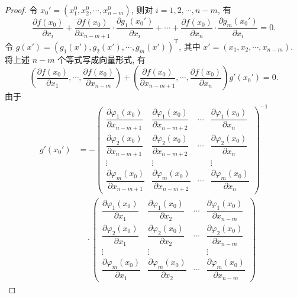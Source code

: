 \documentclass[12pt,fontset=fandol]{ctexart}
\begin{document}
\begin{proof}
令 $x_0'=(x_1^0,x_2^0,\cdots,x_{n-m}^0)$, 则对 $i=1,2,\cdots,n-m$, 有
\[
  \frac{\partial f(x_0)}{\partial x_i}
  +\frac{\partial f(x_0)}{\partial x_{n-m+1}}\cdot
  \frac{\partial g_1(x_0')}{\partial x_i}
  +\cdots+
  \frac{\partial f(x_0)}{\partial x_n}\cdot
  \frac{\partial g_m(x_0')}{\partial x_i}
  =0.
\]
令 $g(x')=(g_1(x'),g_2(x'),\cdots,g_m(x'))^{\mathrm T}$, 其中 $x'=(x_1,x_2,\cdots,x_{n-m})$. 将上述 $n-m$ 个等式写成向量形式, 有
\begin{equation}
  \left(
    \frac{\partial f(x_0)}{\partial x_1},
    \cdots,
    \frac{\partial f(x_0)}{\partial x_{n-m}}
  \right)
  +
  \left(
    \frac{\partial f(x_0)}{\partial x_{n-m+1}},
    \cdots,
    \frac{\partial f(x_0)}{\partial x_n}
  \right)
  g'(x_0')=0.
  \label{course-eq-14-5-4}
\end{equation}
由于
\begin{equation}
\begin{aligned}
  g'(x_0')
  &=
  -
  \begin{pmatrix}
    \dfrac{\partial\varphi_1(x_0)}{\partial x_{n-m+1}} &
    \dfrac{\partial\varphi_1(x_0)}{\partial x_{n-m+2}} &
    \cdots &
    \dfrac{\partial\varphi_1(x_0)}{\partial x_n}\\
    \dfrac{\partial\varphi_2(x_0)}{\partial x_{n-m+1}} &
    \dfrac{\partial\varphi_2(x_0)}{\partial x_{n-m+2}} &
    \cdots &
    \dfrac{\partial\varphi_2(x_0)}{\partial x_n}\\
    \vdots & \vdots & & \vdots\\
    \dfrac{\partial\varphi_m(x_0)}{\partial x_{n-m+1}} &
    \dfrac{\partial\varphi_m(x_0)}{\partial x_{n-m+2}} &
    \cdots &
    \dfrac{\partial\varphi_m(x_0)}{\partial x_n}
  \end{pmatrix}^{-1}\\
  &\quad\cdot
  \begin{pmatrix}
    \dfrac{\partial\varphi_1(x_0)}{\partial x_1} &
    \dfrac{\partial\varphi_1(x_0)}{\partial x_2} &
    \cdots &
    \dfrac{\partial\varphi_1(x_0)}{\partial x_{n-m}}\\
    \dfrac{\partial\varphi_2(x_0)}{\partial x_1} &
    \dfrac{\partial\varphi_2(x_0)}{\partial x_2} &
    \cdots &
    \dfrac{\partial\varphi_2(x_0)}{\partial x_{n-m}}\\
    \vdots & \vdots & & \vdots\\
    \dfrac{\partial\varphi_m(x_0)}{\partial x_1} &
    \dfrac{\partial\varphi_m(x_0)}{\partial x_2} &
    \cdots &
    \dfrac{\partial\varphi_m(x_0)}{\partial x_{n-m}}
  \end{pmatrix}

\end{aligned}
\end{equation}
\end{proof}
\end{document}

